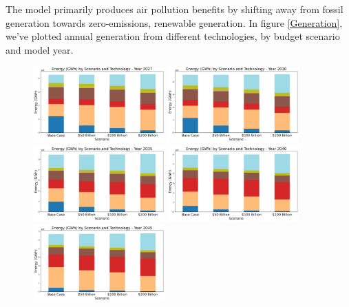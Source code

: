 \documentclass[a4paper]{article}
\theoremstyle{definition}
\theoremstyle{plain}
\begin{document}
The model primarily produces air pollution benefits by shifting away from fossil generation towards zero-emissions, renewable generation. In figure \ref{Generation}, we've plotted annual generation from different technologies, by budget scenario and model year.

\begin{figure}
    \centering
    {\includegraphics[width=0.45\textwidth]{Figures/EndogenousPaper/Dispatch_Relative_by_scenario_2027.png}}
    {\includegraphics[width=0.45\textwidth]{Figures/EndogenousPaper/Dispatch_Relative_by_scenario_2030.png}}\\
    {\includegraphics[width=0.45\textwidth]{Figures/EndogenousPaper/Dispatch_Relative_by_scenario_2035.png}}
    {\includegraphics[width=0.45\textwidth]{Figures/EndogenousPaper/Dispatch_Relative_by_scenario_2040.png}}\\
    {\includegraphics[width=0.45\textwidth]{Figures/EndogenousPaper/Dispatch_Relative_by_scenario_2045.png}}

\end{figure}
\end{document}
